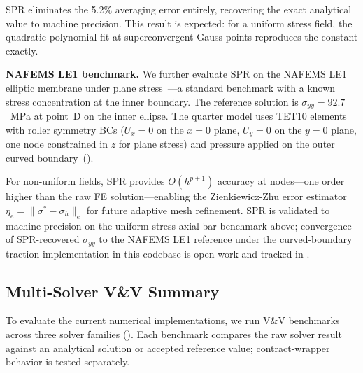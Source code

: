 \documentclass[journal]{IEEEtran}
\begin{document}
SPR eliminates the 5.2\% averaging error entirely, recovering the exact
analytical value to machine precision. This result is expected: for a
uniform stress field, the quadratic polynomial fit at superconvergent
Gauss points reproduces the constant exactly.

\textbf{NAFEMS LE1 benchmark.}
We further evaluate SPR on the NAFEMS LE1 elliptic membrane under plane
stress~\cite{NAFEMS1990}---a standard benchmark with a known stress
concentration at the inner boundary. The reference solution is
$\sigma_{yy} = 92.7$~MPa at point~D on the inner ellipse. The quarter
model uses TET10 elements with roller symmetry BCs ($U_x = 0$ on the
$x = 0$ plane, $U_y = 0$ on the $y = 0$ plane, one node constrained
in $z$ for plane stress) and pressure applied on the outer curved
boundary~().

For non-uniform fields, SPR provides $O(h^{p+1})$ accuracy at
nodes---one order higher than the raw FE solution---enabling the
Zienkiewicz-Zhu error estimator $\eta_e = \|\sigma^* - \sigma_h\|_e$ for
future adaptive mesh refinement. SPR is validated to machine precision
on the uniform-stress axial bar benchmark above; convergence of SPR-recovered
$\sigma_{yy}$ to the NAFEMS LE1 reference under the curved-boundary
traction implementation in this codebase is open work and tracked in
.

\subsection{Multi-Solver V\&V Summary}

To evaluate the current numerical implementations, we run V\&V benchmarks
across three solver families (). Each benchmark compares
the raw solver result against an analytical solution or accepted reference
value; contract-wrapper behavior is tested separately.
\end{document}
